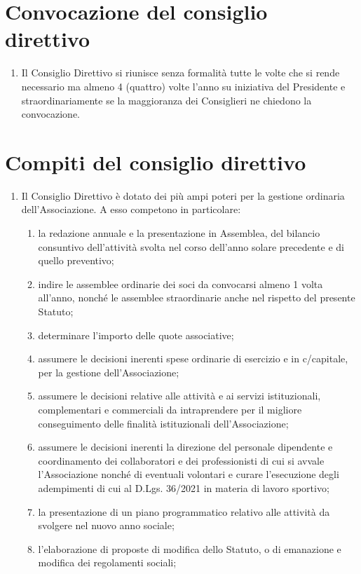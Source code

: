 \documentclass{djtsdoc}
\begin{document}
	\section{Convocazione del consiglio direttivo}
	\begin{enumerate}
		\item Il Consiglio Direttivo si riunisce senza formalità tutte le volte che si rende necessario ma almeno 4 (quattro) volte l'anno su iniziativa del Presidente e straordinariamente se la maggioranza dei Consiglieri ne chiedono la convocazione.
	\end{enumerate}
	
	\section{Compiti del consiglio direttivo}
	\begin{enumerate}
		\item Il Consiglio Direttivo è dotato dei più ampi poteri per la gestione ordinaria dell'Associazione. A esso competono in particolare:
		\begin{enumerate}
			\item la redazione annuale e la presentazione in Assemblea, del bilancio consuntivo dell'attività svolta nel corso dell'anno solare precedente e di quello preventivo;
			\item indire le assemblee ordinarie dei soci da convocarsi almeno 1 volta all'anno, nonché le assemblee straordinarie anche nel rispetto del presente Statuto;
			\item determinare l'importo delle quote associative;
			\item assumere le decisioni inerenti spese ordinarie di esercizio e in c/capitale, per la gestione dell'Associazione;
			\item assumere le decisioni relative alle attività e ai servizi istituzionali, complementari e commerciali da intraprendere per il migliore conseguimento delle finalità istituzionali dell'Associazione;
			\item assumere le decisioni inerenti la direzione del personale dipendente e coordinamento dei collaboratori e dei professionisti di cui si avvale l'Associazione nonché di eventuali volontari e curare l'esecuzione degli adempimenti di cui al D.Lgs. 36/2021 in materia di lavoro sportivo;
			\item la presentazione di un piano programmatico relativo alle attività da svolgere nel nuovo anno sociale;
			\item l'elaborazione di proposte di modifica dello Statuto, o di emanazione e modifica dei regolamenti sociali;

\end{enumerate}
\end{enumerate}
\end{document}
